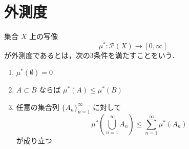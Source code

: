 \section{外測度}

\begin{definition}[外測度]
集合 $X$ 上の写像
\[
\mu^* : \mathcal P(X) \to [0,\infty]
\]
が外測度であるとは，次の3条件を満たすことをいう．
\begin{enumerate}
    \item $\mu^*(\emptyset)=0$
    \item $A \subset B$ ならば $\mu^*(A) \le \mu^*(B)$
    \item 任意の集合列 $\{A_n\}_{n=1}^{\infty}$ に対して
    \[
    \mu^*\left(\bigcup_{n=1}^{\infty} A_n\right)
    \le
    \sum_{n=1}^{\infty} \mu^*(A_n)
    \]
    が成り立つ
\end{enumerate}
\end{definition}

